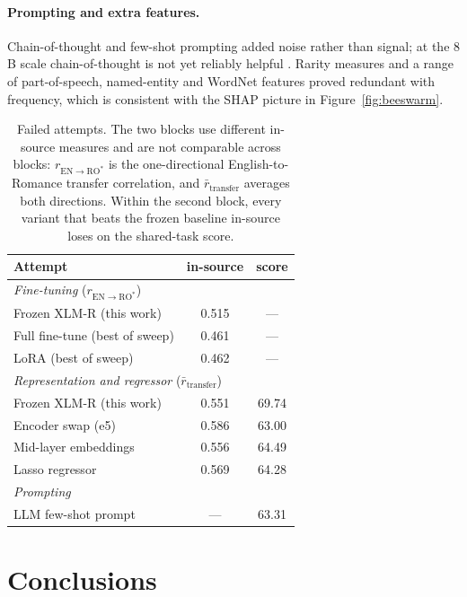 \paragraph{Prompting and extra features.}
Chain-of-thought and few-shot prompting added noise rather than signal;
at the $8$B scale chain-of-thought is not yet reliably helpful
\citep{wei2022cot}. Rarity measures and a range of part-of-speech,
named-entity and WordNet features proved redundant with frequency,
which is consistent with the SHAP picture in
Figure~\ref{fig:beeswarm}.

\begin{table}[tbp]
\centering\small
\begin{tabular}{lcc}
\toprule
\textbf{Attempt} & \textbf{in-source} & \textbf{score} \\
\midrule
\multicolumn{3}{l}{\emph{Fine-tuning} ($r_{\mathrm{EN}\rightarrow\mathrm{RO}^{*}}$)} \\
Frozen XLM-R (this work) & 0.515 & --- \\
Full fine-tune (best of sweep) & 0.461 & --- \\
LoRA (best of sweep) & 0.462 & --- \\
\midrule
\multicolumn{3}{l}{\emph{Representation and regressor} ($\bar{r}_{\mathrm{transfer}}$)} \\
Frozen XLM-R (this work) & 0.551 & 69.74 \\
Encoder swap (e5) & 0.586 & 63.00 \\
Mid-layer embeddings & 0.556 & 64.49 \\
Lasso regressor & 0.569 & 64.28 \\
\midrule
\multicolumn{3}{l}{\emph{Prompting}} \\
LLM few-shot prompt & --- & 63.31 \\
\bottomrule
\end{tabular}
\caption{Failed attempts. The two blocks use different in-source measures and are not comparable across blocks:
$r_{\mathrm{EN}\rightarrow\mathrm{RO}^{*}}$ is the one-directional English-to-Romance transfer correlation, and
$\bar{r}_{\mathrm{transfer}}$ averages both directions. Within the second block, every variant that beats the
frozen baseline in-source loses on the shared-task score.}
\label{tab:fail}
\end{table}

\section{Conclusions}
\label{section:conclusions}

